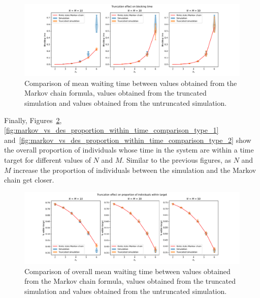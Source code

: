 \begin{figure}[H]
    \includegraphics[width=\textwidth]{chapters/03_queueing_model/img/numeric_results_and_timings/truncation_effect/blocking_time_type_2.pdf}
    \caption{
        Comparison of mean waiting time between values obtained from the Markov
        chain formula, values obtained from the truncated simulation and values
        obtained from the untruncated simulation.
    }
    \label{fig:markov_vs_des_blocking_time_comparison_overall}
\end{figure}

Finally, Figures~\ref{fig:markov_vs_des_proportion_within_time_comparison_overall},
\ref{fig:markov_vs_des_proportion_within_time_comparison_type_1}
and~\ref{fig:markov_vs_des_proportion_within_time_comparison_type_2} show the
overall proportion of individuals whose time in the system are within
a time target for different values of \(N\) and \(M\).
Similar to the previous figures, as \(N\) and \(M\) increase the proportion of
individuals between the simulation and the Markov chain get closer.


\begin{figure}[H]
    \includegraphics[width=\textwidth]{chapters/03_queueing_model/img/numeric_results_and_timings/truncation_effect/proportion_overall.pdf}
    \caption{
        Comparison of overall mean waiting time between values obtained from the
        Markov chain formula, values obtained from the truncated simulation and
        values obtained from the untruncated simulation.
    }
    \label{fig:markov_vs_des_proportion_within_time_comparison_overall}
\end{figure}

